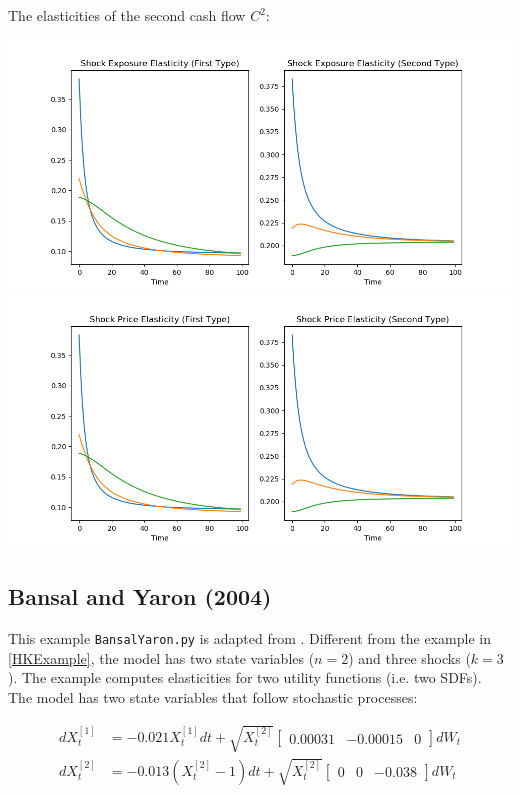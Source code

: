 \documentclass[12pt]{article}
\begin{document}
The elasticities of the second cash flow $C^2$:
\begin{center}
\includegraphics[scale=.4]{HK_expoC2.png}  \\
\includegraphics[scale=.4]{HK_priceC2.png} \\
\end{center}

\subsection{Bansal and Yaron (2004)}

This example \texttt{BansalYaron.py} is adapted from \citet{bansal_yaron}. Different from the example in \ref{HKExample}, the model has two state variables ($n = 2$) and three shocks ($k = 3$). The example computes elasticities for two utility functions (i.e. two SDFs).\\

The model has two state variables that follow stochastic processes:

\begin{align*}
dX^{[1]}_t &= -0.021 X^{[1]}_t dt + \sqrt{X^{[2]}_t} \begin{bmatrix} 0.00031 & -0.00015 & 0 \end{bmatrix} dW_t \\
dX^{[2]}_t &= -0.013 (X^{[2]}_t - 1) dt + \sqrt{X^{[2]}_t} \begin{bmatrix} 0 & 0 & -0.038 \end{bmatrix} dW_t \\
\end{align*}
\end{document}
